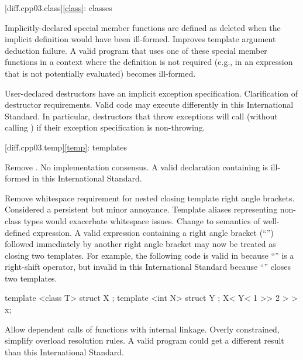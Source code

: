 [diff.cpp03.class]{\ref{class}: classes}

\change
Implicitly-declared special member functions are defined as deleted
when the implicit definition would have been ill-formed.
\rationale
Improves template argument deduction failure.
\effect
A valid \CppIII{} program that uses one of these special member functions in a
context where the definition is not required (e.g., in an expression that is
not potentially evaluated) becomes ill-formed.

\change
User-declared destructors have an implicit exception specification.
\rationale
Clarification of destructor requirements.
\effect
Valid \CppIII{} code may execute differently in this International Standard. In
particular, destructors that throw exceptions will call 
(without calling ) if their exception specification is
non-throwing.

[diff.cpp03.temp]{\ref{temp}: templates}

\change
Remove .
\rationale
No implementation consensus.
\effect
A valid \CppIII{} declaration containing  is ill-formed in this
International Standard.

\change
Remove whitespace requirement for nested closing template right angle
brackets.
\rationale
Considered a persistent but minor annoyance. Template aliases
representing non-class types would exacerbate whitespace issues.
\effect
Change to semantics of well-defined expression. A valid \CppIII{} expression
containing a right angle bracket (``\tcode{>}'') followed immediately by
another right angle bracket may now be treated as closing two templates.
For example, the following code is valid in \CppIII{} because ``\tcode{>>}''
is a right-shift operator, but invalid in this International Standard because
``\tcode{>>}'' closes two templates.

\begin{codeblock}
template <class T> struct X { };
template <int N> struct Y { };
X< Y< 1 >> 2 > > x;
\end{codeblock}

\change
Allow dependent calls of functions with internal linkage.
\rationale
Overly constrained, simplify overload resolution rules.
\effect
A valid \CppIII{} program could get a different result than this
International Standard.

